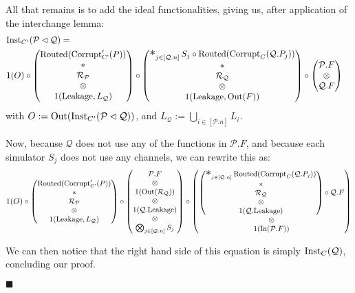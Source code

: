 \begin{theorem}
All that remains is to add the ideal functionalities, giving us,
after application of the interchange lemma:
$$
\begin{aligned}
  &\tx{Inst}_{C'}(\mathcal{P} \lhd \mathcal{Q}) =\cr
&1(O) \circ
\begin{pmatrix}
  \tx{Routed}(\tx{Corrupt}'_{\tx{C'}}(P))\cr
  *\cr
  \mathcal{R}_{\mathcal{P}}\cr
  \otimes\cr
  1(\tx{Leakage}, L_{\mathcal{Q}})
\end{pmatrix}
\circ
\begin{pmatrix}
\bigast_{j \in [\mathcal{Q}.n]}
  S_j \circ \tx{Routed}(\tx{Corrupt}_C(\mathcal{Q}.P_j))
  \cr
  *\cr
  \mathcal{R}_{\mathcal{Q}}\cr
  \otimes\cr
  1(\tx{Leakage}, \tx{Out}(F))
\end{pmatrix}
\circ
\begin{pmatrix}
  \mathcal{P}.F\cr
  \otimes\cr
  \mathcal{Q}.F
\end{pmatrix}
\end{aligned}
$$
with $O := \text{Out}(\text{Inst}_{C'}(\mathcal{P} \lhd \mathcal{Q}))$,
and $L_{\mathcal{Q}} := \bigcup_{i \in [\mathcal{P}.n]} L_i$.

Now, because $\mathcal{Q}$ does not use any of the functions
in $\mathcal{P}.F$, and because each simulator $S_j$
does not use any channels, we can rewrite this as:
$$
\small
1(O) \circ
\begin{pmatrix}
  \tx{Routed}(\tx{Corrupt}'_{\tx{C'}}(P))\cr
  *\cr
  \mathcal{R}_{\mathcal{P}}\cr
  \otimes\cr
  1(\tx{Leakage}, L_{\mathcal{Q}})
\end{pmatrix}
\circ
\begin{pmatrix}
  \mathcal{P}.F\cr
  \otimes\cr
  1(\tx{Out}(\mathcal{R}_{\mathcal{Q}}))\cr
  \otimes\cr
  1(\mathcal{Q}.\tx{Leakage})\cr
  \otimes\cr
  \bigotimes_{j \in [\mathcal{Q}.n]} S_j
\end{pmatrix}
\circ
\begin{pmatrix}
\begin{pmatrix}
\bigast_{j \in [\mathcal{Q}.n]}
  \tx{Routed}(\tx{Corrupt}_C(\mathcal{Q}.P_j))
  \cr
  *\cr
  \mathcal{R}_{\mathcal{Q}}\cr
  \otimes\cr
  1(\mathcal{Q}.\tx{Leakage})
\end{pmatrix}
\circ
  \mathcal{Q}.F
  \cr
  \otimes\cr
  1(\tx{In}(\mathcal{P}.F))
\end{pmatrix}
$$

We can then notice that the right hand side of this equation
is simply $\text{Inst}_C(\mathcal{Q})$,
concluding our proof.

$\blacksquare$

\end{theorem}

